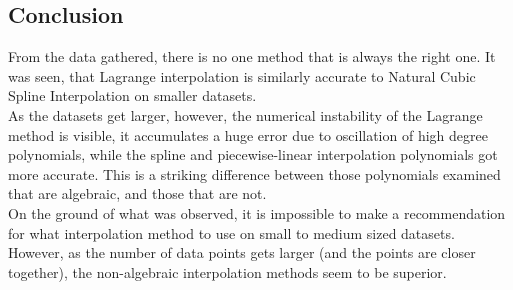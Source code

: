 \documentclass[a4paper,11pt, notitlepage]{article}
\begin{document}
\begin{onehalfspace}
\section{Conclusion}
\label{sec:Conclusion}
From the data gathered, there is no one method that is always the right one. It was seen, that Lagrange interpolation is similarly accurate to Natural Cubic Spline Interpolation on smaller datasets. \\
As the datasets get larger, however, the numerical instability of the Lagrange method is visible, it accumulates a huge error due to oscillation of high degree polynomials, while the spline and piecewise-linear interpolation polynomials got more accurate. This is a striking difference between those polynomials examined that are algebraic, and those that are not. \\
On the ground of what was observed, it is impossible to make a recommendation for what interpolation method to use on small to medium sized datasets. However, as the number of data points gets larger (and the points are closer together), the non-algebraic interpolation methods seem to be superior. 


\newpage





\end{onehalfspace}
\end{document}
